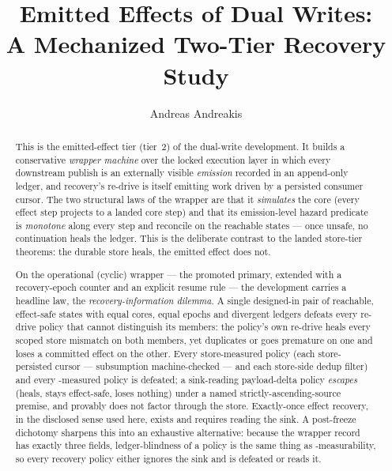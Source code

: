 \documentclass[11pt,a4paper]{article}
\begin{document}
\title{Emitted Effects of Dual Writes:\\
  A Mechanized Two-Tier Recovery Study}
\author{Andreas Andreakis}
\maketitle

\begin{abstract}
  This is the emitted-effect tier (tier~2) of the dual-write development. It
  builds a conservative \emph{wrapper machine} over the locked
   execution layer
  in which every downstream publish is an externally visible \emph{emission}
  recorded in an append-only ledger, and recovery's re-drive is itself emitting
  work driven by a persisted consumer cursor. The two structural laws of the
  wrapper are that it \emph{simulates} the core (every effect step projects to a
  landed core step) and that its emission-level hazard predicate
   is \emph{monotone} along every step and
  reconcile on the reachable states --- once unsafe, no continuation heals the
  ledger. This is the deliberate contrast to the landed store-tier theorems: the
  durable store heals, the emitted effect does not.

  On the operational (cyclic) wrapper --- the promoted primary, extended with a
  recovery-epoch counter and an explicit resume rule --- the development carries a
  headline law, the \emph{recovery-information dilemma}. A single designed-in pair
  of reachable, effect-safe states with equal cores, equal epochs and divergent
  ledgers defeats every re-drive policy that cannot distinguish its members: the
  policy's own re-drive heals every scoped store mismatch on both members, yet
  duplicates or goes premature on one and loses a committed effect on the other.
  Every store-measured policy (each store-persisted cursor --- subsumption
  machine-checked --- and each store-side dedup filter) and every
  -measured policy is defeated; a sink-reading payload-delta
  policy \emph{escapes} (heals, stays effect-safe, loses nothing) under a named
  strictly-ascending-source premise, and provably does not factor through the
  store. Exactly-once effect recovery, in the disclosed sense used here, exists
  and requires reading the sink. A post-freeze dichotomy sharpens this into an
  exhaustive alternative: because the wrapper record has exactly three fields,
  ledger-blindness of a policy is the same thing as
  -measurability, so every recovery policy either ignores the
  sink and is defeated or reads it.


\end{abstract}
\end{document}
